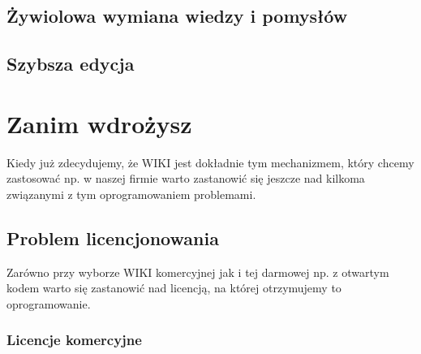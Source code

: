 \documentclass{article}
\begin{document}
	\subsection{Żywiolowa wymiana wiedzy i pomysłów}


	\subsection{Szybsza edycja}


\newpage
\section{Zanim wdrożysz}
Kiedy już zdecydujemy, że WIKI jest dokładnie tym mechanizmem, który chcemy zastosować np. w naszej firmie warto zastanowić się jeszcze nad kilkoma związanymi z tym oprogramowaniem problemami.
	\subsection{Problem licencjonowania}
	Zarówno przy wyborze WIKI komercyjnej jak i tej darmowej np. z otwartym kodem warto się zastanowić nad licencją, na której otrzymujemy to oprogramowanie.
	\subsubsection{Licencje komercyjne}
\end{document}
